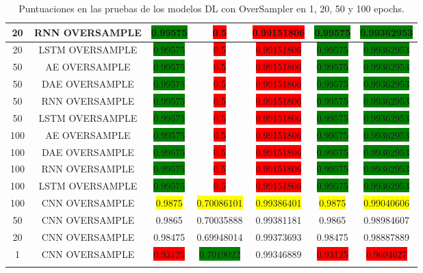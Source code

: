 \begin{longtable}{|c|c|c|c|c|c|c|}
	20 & RNN OVERSAMPLE & \colorbox{green}{0.99575} & \colorbox{red}{0.5} & \colorbox{red}{0.99151806} & \colorbox{green}{0.99575} & \colorbox{green}{0.99362953}\\ \hline
	20 & LSTM OVERSAMPLE & \colorbox{green}{0.99575} & \colorbox{red}{0.5} & \colorbox{red}{0.99151806} & \colorbox{green}{0.99575} & \colorbox{green}{0.99362953}\\ \hline
	50 & AE OVERSAMPLE & \colorbox{green}{0.99575} & \colorbox{red}{0.5} & \colorbox{red}{0.99151806} & \colorbox{green}{0.99575} & \colorbox{green}{0.99362953}\\ \hline
	50 & DAE OVERSAMPLE & \colorbox{green}{0.99575} & \colorbox{red}{0.5} & \colorbox{red}{0.99151806} & \colorbox{green}{0.99575} & \colorbox{green}{0.99362953}\\ \hline
	50 & RNN OVERSAMPLE & \colorbox{green}{0.99575} & \colorbox{red}{0.5} & \colorbox{red}{0.99151806} & \colorbox{green}{0.99575} & \colorbox{green}{0.99362953}\\ \hline
	50 & LSTM OVERSAMPLE & \colorbox{green}{0.99575} & \colorbox{red}{0.5} & \colorbox{red}{0.99151806} & \colorbox{green}{0.99575} & \colorbox{green}{0.99362953}\\ \hline
	100 & AE OVERSAMPLE & \colorbox{green}{0.99575} & \colorbox{red}{0.5} & \colorbox{red}{0.99151806} & \colorbox{green}{0.99575} & \colorbox{green}{0.99362953}\\ \hline
	100 & DAE OVERSAMPLE & \colorbox{green}{0.99575} & \colorbox{red}{0.5} & \colorbox{red}{0.99151806} & \colorbox{green}{0.99575} & \colorbox{green}{0.99362953}\\ \hline
	100 & RNN OVERSAMPLE & \colorbox{green}{0.99575} & \colorbox{red}{0.5} & \colorbox{red}{0.99151806} & \colorbox{green}{0.99575} & \colorbox{green}{0.99362953}\\ \hline
	100 & LSTM OVERSAMPLE & \colorbox{green}{0.99575} & \colorbox{red}{0.5} & \colorbox{red}{0.99151806} & \colorbox{green}{0.99575} & \colorbox{green}{0.99362953}\\ \hline
	100 & CNN OVERSAMPLE & \colorbox{yellow}{0.9875} & \colorbox{yellow}{0.70086101} & \colorbox{yellow}{0.99386401} & \colorbox{yellow}{0.9875} & \colorbox{yellow}{0.99040606}\\ \hline
	50 & CNN OVERSAMPLE & 0.9865 & 0.70035888 & 0.99381181 & 0.9865 & 0.98984607\\ \hline
	20 & CNN OVERSAMPLE & 0.98475 & 0.69948014 & 0.99373693 & 0.98475 & 0.98887889\\ \hline
	1 & CNN OVERSAMPLE & \colorbox{red}{0.93125} & \colorbox{green}{0.7019022} & 0.99346889 & \colorbox{red}{0.93125} & \colorbox{red}{0.9604627}\\ \hline
	\caption{Puntuaciones en las pruebas de los modelos DL con OverSampler en 1, 20, 50 y 100 epochs.}
	\label{t:6}
\end{longtable}

